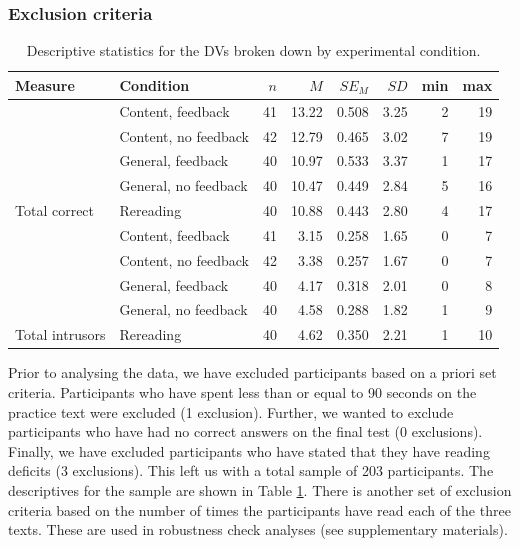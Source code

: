 \documentclass[11pt,]{article}
\begin{document}
\hypertarget{exclusion-criteria}{%
\subsubsection{Exclusion criteria}\label{exclusion-criteria}}

\begin{table}[t]

\caption{\label{tab:descTable}\label{descTable}Descriptive statistics for the DVs broken down
                     by experimental condition.}
\centering
\begin{tabular}{llrrrrrr}
\toprule
Measure & Condition & $n$ & $M$ & $SE_M$ & $SD$ & min & max\\
\midrule
 & Content, feedback & 41 & 13.22 & 0.508 & 3.25 & 2 & 19\\

 & Content, no feedback & 42 & 12.79 & 0.465 & 3.02 & 7 & 19\\

 & General, feedback & 40 & 10.97 & 0.533 & 3.37 & 1 & 17\\

 & General, no feedback & 40 & 10.47 & 0.449 & 2.84 & 5 & 16\\

\multirow{-5}{*}{\raggedright\arraybackslash Total correct} & Rereading & 40 & 10.88 & 0.443 & 2.80 & 4 & 17\\
\cmidrule{1-8}
 & Content, feedback & 41 & 3.15 & 0.258 & 1.65 & 0 & 7\\

 & Content, no feedback & 42 & 3.38 & 0.257 & 1.67 & 0 & 7\\

 & General, feedback & 40 & 4.17 & 0.318 & 2.01 & 0 & 8\\

 & General, no feedback & 40 & 4.58 & 0.288 & 1.82 & 1 & 9\\

\multirow{-5}{*}{\raggedright\arraybackslash Total intrusors} & Rereading & 40 & 4.62 & 0.350 & 2.21 & 1 & 10\\
\bottomrule
\end{tabular}
\end{table}

Prior to analysing the data, we have excluded participants based on a
priori set criteria. Participants who have spent less than or equal to
90 seconds on the practice text were excluded (1 exclusion). Further, we
wanted to exclude participants who have had no correct answers on the
final test (0 exclusions). Finally, we have excluded participants who
have stated that they have reading deficits (3 exclusions). This left us
with a total sample of 203 participants. The descriptives for the sample
are shown in Table \ref{descTable}. There is another set of exclusion
criteria based on the number of times the participants have read each of
the three texts. These are used in robustness check analyses (see
supplementary materials).
\end{document}
